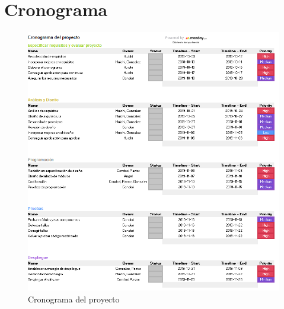\documentclass[preprint,12pt]{elsarticle}
\begin{document}


\section{Cronograma}

\begin{figure}[htb]
	\begin{center}
		\includegraphics[width=14cm]{./IMAGENES/Gannt} 
		\caption{Cronograma del proyecto}
	\end{center}
\end{figure}




	
	\newpage
	
		 
	
	
\end{document}
